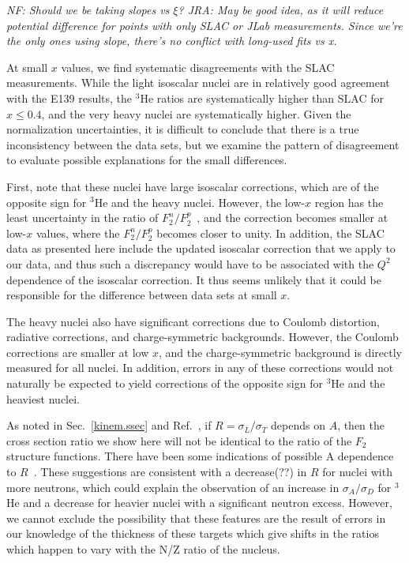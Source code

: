 \textit{NF: Should we be taking slopes vs $\xi$?  JRA: May be good idea, as it
will reduce potential difference for points with only SLAC or JLab
measurements. Since we're the only ones using slope, there's no conflict with
long-used fits vs x.}


At small $x$ values, we find systematic disagreements with the SLAC
measurements.  While the light isoscalar nuclei are in relatively good
agreement with the E139 results, the $^3$He ratios are systematically higher
than SLAC for $x \leq 0.4$, and the very heavy nuclei are systematically
higher. Given the normalization uncertainties, it is difficult to conclude
that there is a true inconsistency between the data sets, but we examine the
pattern of disagreement to evaluate possible explanations for the small
differences.

First, note that these nuclei have large isoscalar corrections, which
are of the opposite sign for $^3$He and the heavy nuclei.  However, the
low-$x$ region has the least uncertainty in the ratio of
$F_2^n/F_2^p$~\cite{accardi11, arrington12b}, and the correction becomes
smaller at low-$x$ values, where the $F_2^n/F_2^p$ becomes closer to unity. In
addition, the SLAC data as presented here include the updated isoscalar
correction that we apply to our data, and thus such a discrepancy would have
to be associated with the $Q^2$ dependence of the isoscalar correction.  It
thus seems unlikely that it could be responsible for the difference between
data sets at small $x$.

The heavy nuclei also have significant corrections due to Coulomb distortion,
radiative corrections, and charge-symmetric backgrounds.  However, the Coulomb
corrections are smaller at low $x$, and the charge-symmetric background is
directly measured for all nuclei.  In addition, errors in any of these
corrections would not naturally be expected to yield corrections of the
opposite sign for $^3$He and the heaviest nuclei.

As noted in Sec.~\ref{kinem.ssec} and Ref.~\cite{guzey12}, if $R =
\sigma_L/\sigma_T$ depends on $A$, then the cross section ratio we show here
will not be identical to the ratio of the $F_2$ structure functions.  There
have been some indications of possible A dependence to $R$~\cite{Tao:1995uh,
Tvaskis:2006tv, Solvignon:2009it, Mamyan:2012th}. These suggestions are
consistent with a decrease(??) in $R$ for nuclei with more neutrons, which
could explain the observation of an increase in $\sigma_A/\sigma_D$ for $^3$He
and a decrease for heavier nuclei with a significant neutron excess.  However,
we cannot exclude the possibility that these features are the result of errors
in our knowledge of the thickness of these targets which give shifts in the
ratios which happen to vary with the N/Z ratio of the nucleus.

